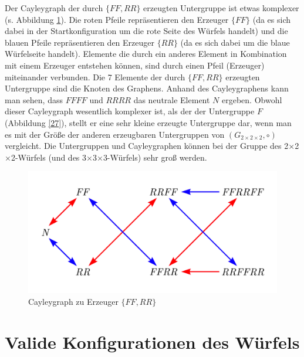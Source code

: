 \documentclass[12pt,a4paper, usenames, dvipsnames]{article}
\theoremstyle{mystyle}
\theoremstyle{definition}
\newcommand{\Gtwo}{\ensuremath{G_{2\times 2\times 2}}}
\newcommand{\Ttwo}{2$\times$2$\times$2-}
\newcommand{\Tthree}{3$\times$3$\times$3-}
\begin{document}
Der Cayleygraph der durch $\{ FF, RR \}$ erzeugten Untergruppe ist etwas komplexer (s. Abbildung \ref{28}). 
Die roten Pfeile repräsentieren den Erzeuger $\{FF\}$ (da es sich dabei in der Startkonfiguration um die rote Seite des Würfels handelt) und die blauen Pfeile repräsentieren den Erzeuger $\{RR\}$ (da es sich dabei um die blaue Würfelseite handelt).
Elemente die durch ein anderes Element in Kombination mit einem Erzeuger entstehen können, sind durch einen Pfeil (Erzeuger) miteinander verbunden.
Die 7 Elemente der durch  $\{ FF, RR \}$ erzeugten Untergruppe sind die Knoten des Graphens. 
Anhand des Cayleygraphens kann man sehen, dass $FFFF$ und $RRRR$ das neutrale Element $N$ ergeben.
Obwohl dieser Cayleygraph wesentlich komplexer ist, als der der Untergruppe $F$ (Abbildung \ref{27}), stellt er eine sehr kleine erzeugte Untergruppe dar, wenn man es mit der Größe der anderen erzeugbaren Untergruppen von $(\Gtwo, \circ)$ vergleicht. Die Untergruppen und Cayleygraphen können bei der Gruppe des \Ttwo Würfels (und des \Tthree Würfels) sehr groß werden.
\begin{figure}[H]
\centering
\includegraphics[scale=0.6]{Cayleygraph2.png}
\caption{Cayleygraph zu Erzeuger $\{ FF, RR \}$}
\label{28}
\end{figure}







%
%
%
%
%
%
%
%
%
%
%
%
%
%
%
%
%
\newpage

\section{Valide Konfigurationen des Würfels}
\end{document}
